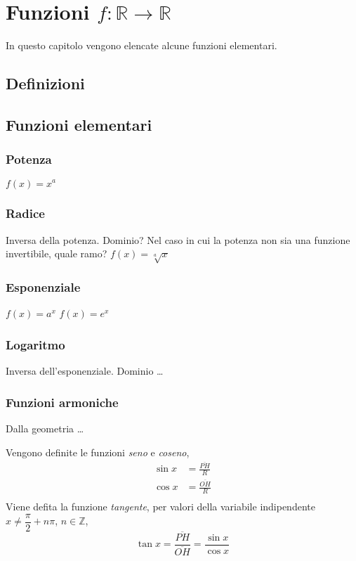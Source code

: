 
\chapter{Funzioni $f:\mathbb{R} \rightarrow \mathbb{R}$}

In questo capitolo vengono elencate alcune funzioni elementari.

\section{Definizioni}
\begin{definition}
\end{definition}


\begin{definition}
\end{definition}

\section{Funzioni elementari}
\subsection{Potenza}
$f(x) = x^a$
\subsection{Radice}
{\color{red} Inversa della potenza. Dominio? Nel caso in cui la potenza non sia una funzione invertibile, quale ramo?}
$f(x) = \sqrt[a]{x}$
\subsection{Esponenziale}
$f(x) = a^x$
$f(x) = e^x$
\subsection{Logaritmo}
{\color{red} Inversa dell'esponenziale. Dominio \dots}


\subsection{Funzioni armoniche}
{\color{red} Dalla geometria \dots}

\noindent
Vengono definite le funzioni \textit{seno} e \textit{coseno},
\begin{equation}
\begin{aligned}
    \sin x &= \frac{\overline{PH}}{R} \\
    \cos x &= \frac{\overline{OH}}{R} \\
\end{aligned}
\end{equation}
Viene defita la funzione \textit{tangente}, per valori della variabile indipendente $x \neq \dfrac{\pi}{2} + n \pi$, $n \in \mathbb{Z}$,
\begin{equation}
    \tan x = \frac{\overline{PH}}{\overline{OH}} = \frac{\sin x}{\cos x}
\end{equation}

